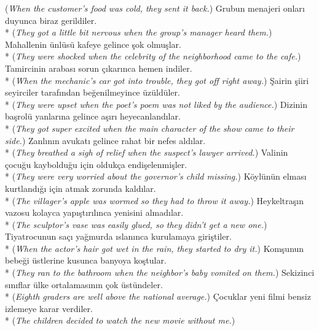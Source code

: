 ({\it When the customer's food was cold, they sent it back.})
\ex Grubun menajeri onlar{\i} duyunca biraz gerildiler. \\*
({\it They got a little bit nervous when the group's manager heard them.})
\ex Mahallenin \"{u}nl\"{u}s\"{u} kafeye gelince \c{s}ok olmu\c{s}lar. \\*
({\it They were shocked when the celebrity of the neighborhood came to the cafe.})
\ex Tamircinin arabas{\i} sorun \c{c}{\i}kar{\i}nca hemen indiler. \\*
({\it When the mechanic's car got into trouble, they got off right away.})
\ex \c{S}airin \c{s}iiri seyirciler taraf{\i}ndan be\u{g}enilmeyince \"{u}z\"{u}ld\"{u}ler. \\*
({\it They were upset when the poet's poem was not liked by the audience.})
\ex Dizinin ba\c{s}rol\"{u} yanlar{\i}na gelince a\c{s}{\i}r{\i} heyecanland{\i}lar. \\*
({\it They got super excited when the main character of the show came to their side.})
\ex Zanl{\i}n{\i}n avukat{\i} gelince rahat bir nefes ald{\i}lar. \\*
({\it They breathed a sigh of relief when the suspect's lawyer arrived.})
\ex Valinin \c{c}ocu\u{g}u kayboldu\u{g}u i\c{c}in olduk\c{c}a endi\c{s}elenmi\c{s}ler. \\*
({\it They were very worried about the governor's child missing.})
\ex K\"{o}yl\"{u}n\"{u}n elmas{\i} kurtland{\i}\u{g}{\i} i\c{c}in atmak zorunda kald{\i}lar. \\*
({\it The villager's apple was wormed so they had to throw it away.})
\ex Heykeltra\c{s}{\i}n vazosu kolayca yap{\i}\c{s}t{\i}r{\i}l{\i}nca yenisini almad{\i}lar. \\*
({\it The sculptor's vase was easily glued, so they didn't get a new one.})
\ex Tiyatrocunun sa\c{c}{\i} ya\u{g}murda {\i}slan{\i}nca kurulamaya giri\c{s}tiler. \\*
({\it When the actor's hair got wet in the rain, they started to dry it.})
\ex Kom\c{s}unun bebe\u{g}i \"{u}stlerine kusunca banyoya ko\c{s}tular. \\*
({\it They ran to the bathroom when the neighbor's baby vomited on them.})
\ex Sekizinci s{\i}n{\i}flar \"{u}lke ortalamas{\i}n{\i}n \c{c}ok \"{u}st\"{u}ndeler. \\*
({\it Eighth graders are well above the national average.})
\ex \c{C}ocuklar yeni filmi bensiz izlemeye karar verdiler. \\*
({\it The children decided to watch the new movie without me.})
